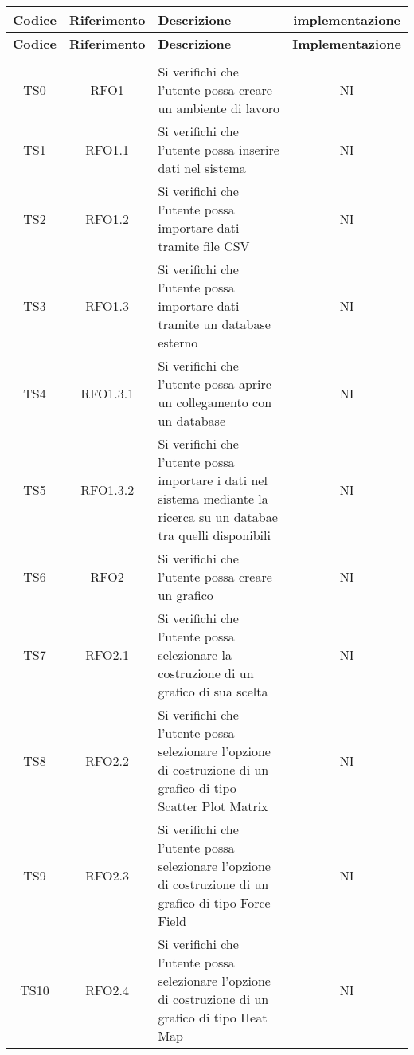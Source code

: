 \documentclass[../piano_di_qualifica.tex]{subfiles}
\begin{document}
\begin{center}
	\begin{longtable}{|c|c|p{8cm}|c|}
		\hline
		\rowcolor{lightgray}
		{\textbf{Codice}} & {\textbf{Riferimento}} & {\textbf{Descrizione}} & {\textbf{implementazione}} \\
		\hline
		\endfirsthead
		\hline
		\rowcolor{lightgray}
		{\textbf{Codice}} & {\textbf{Riferimento}} & {\textbf{Descrizione}} & {\textbf{Implementazione}} \\
		\hline
		\endhead
		
		\hline
		\rowcolor{white}
		\multicolumn{4}{|c|}{\emph{Continua alla pagina successiva...}} \\
		\hline
		\endfoot
		\endlastfoot

		TS0   & RFO1            & Si verifichi che l'utente possa creare un ambiente di lavoro     & NI                         \\
		TS1   & RFO1.1          & Si verifichi che l'utente possa inserire dati nel sistema & NI                         \\
		TS2   & RFO1.2 			& Si verifichi che l'utente possa importare dati tramite file CSV         & NI                         \\
		TS3   & RFO1.3          & Si verifichi che l'utente possa importare dati tramite un database esterno   & NI                  \\
		TS4   & RFO1.3.1      	& Si verifichi che l'utente possa aprire un collegamento con un database & NI                         \\
		TS5   & RFO1.3.2      	& Si verifichi che l'utente possa importare i dati nel sistema mediante la ricerca su un databae tra quelli disponibili & NI  \\
		TS6   & RFO2      		& Si verifichi che l'utente possa creare  un grafico & NI  \\
		TS7   & RFO2.1      	& Si verifichi che l'utente possa selezionare la costruzione di un grafico di sua scelta & NI  \\
		TS8   & RFO2.2      	& Si verifichi che l'utente possa selezionare l'opzione di costruzione di un grafico di tipo Scatter Plot Matrix & NI  \\
		TS9   & RFO2.3     		& Si verifichi che l'utente possa selezionare l'opzione di costruzione di un grafico di tipo Force Field & NI  \\
		TS10  & RFO2.4     		& Si verifichi che l'utente possa selezionare l'opzione di costruzione di un grafico di tipo Heat Map & NI  \\

\end{longtable}
\end{center}
\end{document}
